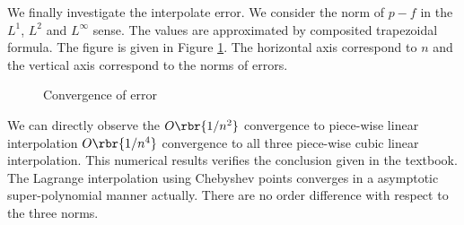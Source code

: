 \documentclass[english, nochinese]{pnote}
\begin{document}
We finally investigate the interpolate error. We consider the norm of $ p - f $ in the $L^1$, $L^2$ and $L^{\infty}$ sense. The values are approximated by composited trapezoidal formula. The figure is given in Figure \ref{Fig:Err}. The horizontal axis correspond to $n$ and the vertical axis correspond to the norms of errors.

\begin{figure}
\centering
\scalebox{0.7}{}
\caption{Convergence of error}
\label{Fig:Err}
\end{figure}

We can directly observe the $ O \rbr{ 1 / n^2 } $ convergence to piece-wise linear interpolation $ O \rbr{ 1 / n^4 } $ convergence to all three piece-wise cubic linear interpolation. This numerical results verifies the conclusion given in the textbook. The Lagrange interpolation using Chebyshev points converges in a asymptotic super-polynomial manner actually. There are no order difference with respect to the three norms.
\end{document}
